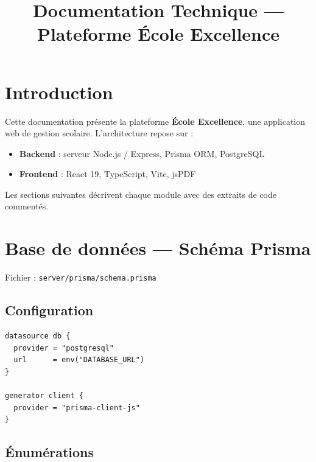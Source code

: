 \documentclass[12pt,a4paper]{article}
\begin{document}
\title{Documentation Technique --- Plateforme École Excellence}
\maketitle
\thispagestyle{empty}
\newpage

\tableofcontents
\newpage

\section{Introduction}

Cette documentation présente la plateforme \textbf{École Excellence}, une application web de gestion scolaire. L'architecture repose sur :
\begin{itemize}
  \item \textbf{Backend} : serveur Node.js / Express, Prisma ORM, PostgreSQL
  \item \textbf{Frontend} : React 19, TypeScript, Vite, jsPDF
\end{itemize}

Les sections suivantes décrivent chaque module avec des extraits de code commentés.

\section{Base de données --- Schéma Prisma}

Fichier : \texttt{server/prisma/schema.prisma}

\subsection{Configuration}

\begin{lstlisting}[style=code]
datasource db {
  provider = "postgresql"
  url      = env("DATABASE_URL")
}

generator client {
  provider = "prisma-client-js"
}
\end{lstlisting}

\subsection{Énumérations}
\end{document}
